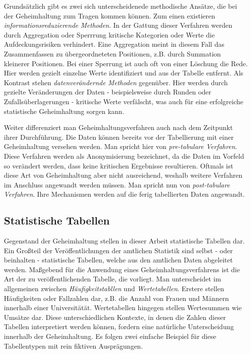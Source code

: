 Grundsätzlich gibt es zwei sich unterscheidenede methodische Ansätze, die bei der Geheimhaltung zum Tragen kommen können. Zum einen existieren \textit{informationsreduzierende Methoden}. In der Gattung dieser Verfahren werden durch Aggregation oder Sperrrung kritische Kategorien oder Werte die Aufdeckungsrisiken verhindert. Eine Aggregation meint in diesem Fall das Zusammenfassen zu übergeordneteten Positionen, z.B. durch Summation kleinerer Positionen. Bei einer Sperrung ist auch oft von einer Löschung die Rede. Hier werden gezielt einzelne Werte identifiziert und aus der Tabelle entfernt. Als Kontrast stehen \textit{datenverändernde Methoden} gegenüber. Hier werden durch gezielte Veränderungen der Daten - beispielsweise durch Runden oder Zufallsüberlagerungen - kritische Werte verfälscht, was auch für eine erfolgreiche statistische Geheimhaltung sorgen kann. 

Weiter differenziert man Geheimhaltungsverfahren auch nach dem Zeitpunkt ihrer Durchführung. Die Daten können bereits vor der Tabellierung mit einer Geheimhaltung versehen werden. Man spricht hier von \textit{pre-tabulare Verfahren}. Diese Verfahren werden als Anonymisierung bezeichnet, da die Daten im Vorfeld so verändert werden, dass keine kritischen Ergebnisse resultieren. Oftmals ist diese Art von Geheimhaltung aber nicht ausreichend, weshalb weitere Verfahren im Anschluss angewandt werden müssen. Man spricht nun von \textit{post-tabulare Verfahren}. Ihre Mechanismen werden auf die ferig tabellierten Daten angewandt.


\subsection{Statistische Tabellen}

Gegenstand der Geheimhaltung stellen in dieser Arbeit statistische Tabellen dar. Ein Gro\ss teil der Veröffentlichungen der amtlichen Statistik sind selbst - oder beinhalten - statistische Tabellen, welche aus den amtlichen Daten abgeleitet werden. Ma\ss gebend für die Anwendung eines Geheimhaltungsverfahrens ist die Art der zu veröffentlichenden Tabelle, die vorliegt. Man unterscheidet im allgemeinen zwischen \textit{Häufigkeitstabllen} und \textit{Wertetabellen}. Erstere stellen Häufigkeiten oder Fallzahlen dar, z.B. die Anzahl von Frauen und Männern innerhalb einer Universitätät. Wertetabellen hingegen stellen Wertesummen wie Umsätze dar. Diese unterschiedlichen Kontexte, in denen die Zahlen dieser Tabellen interpretiert werden können, fordern eine natürliche Unterscheidung innerhalb der Geheimhaltung. Es folgen zwei einfache Beispiel für diese Tabellentypen mit rein fiktiven Ausprägungen.

